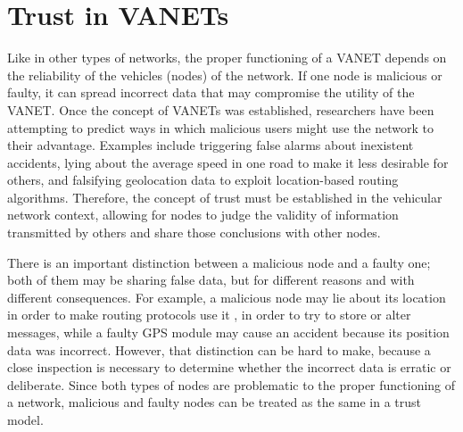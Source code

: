 
\section{Trust in VANETs}

Like in other types of networks, the proper functioning of a VANET depends on the reliability of the vehicles (nodes) of the network.
If one node is malicious or faulty, it can spread incorrect data that may compromise the utility of the VANET.
Once the concept of VANETs was established, researchers have been attempting to predict ways in which malicious users might use the network to their advantage.
Examples include triggering false alarms about inexistent accidents, lying about the average speed in one road to make it less desirable for others, and falsifying geolocation data to exploit location-based routing algorithms. Therefore, the concept of trust must be established in the vehicular network context, allowing for nodes to judge the validity of information transmitted by others and share those conclusions with other nodes.

There is an important distinction between a malicious node and a faulty one; both of them may be sharing false data, but for different reasons and with different consequences.
For example, a malicious node may lie about its location in order to make routing protocols use it \cite{leinmuller2005influence}, in order to try to store or alter messages, while a faulty GPS module may cause an accident because its position data was incorrect.
However, that distinction can be hard to make, because a close inspection is necessary to determine whether the incorrect data is erratic or deliberate.
Since both types of nodes are problematic to the proper functioning of a network, malicious and faulty nodes can be treated as the same in a trust model.


